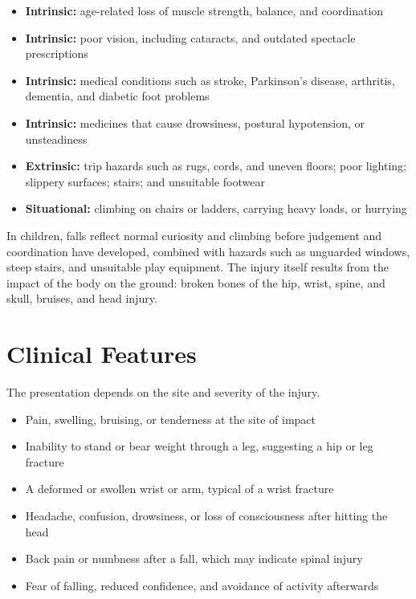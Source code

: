 \begin{itemize}
    \item \textbf{Intrinsic:} age-related loss of muscle strength, balance, and coordination
    \item \textbf{Intrinsic:} poor vision, including cataracts, and outdated spectacle prescriptions
    \item \textbf{Intrinsic:} medical conditions such as stroke, Parkinson's disease, arthritis, dementia, and diabetic foot problems
    \item \textbf{Intrinsic:} medicines that cause drowsiness, postural hypotension, or unsteadiness
    \item \textbf{Extrinsic:} trip hazards such as rugs, cords, and uneven floors; poor lighting; slippery surfaces; stairs; and unsuitable footwear
    \item \textbf{Situational:} climbing on chairs or ladders, carrying heavy loads, or hurrying
\end{itemize}

In children, falls reflect normal curiosity and climbing before judgement and coordination have developed, combined with hazards such as unguarded windows, steep stairs, and unsuitable play equipment. The injury itself results from the impact of the body on the ground: broken bones of the hip, wrist, spine, and skull, bruises, and head injury.

\section*{Clinical Features}
The presentation depends on the site and severity of the injury.

\begin{itemize}
    \item Pain, swelling, bruising, or tenderness at the site of impact
    \item Inability to stand or bear weight through a leg, suggesting a hip or leg fracture
    \item A deformed or swollen wrist or arm, typical of a wrist fracture
    \item Headache, confusion, drowsiness, or loss of consciousness after hitting the head
    \item Back pain or numbness after a fall, which may indicate spinal injury
    \item Fear of falling, reduced confidence, and avoidance of activity afterwards
\end{itemize}

